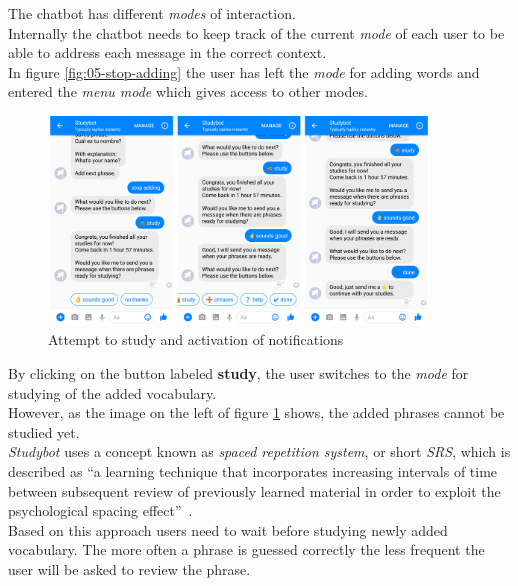The chatbot has different \emph{modes} of interaction.
\\
Internally the chatbot needs to keep track of the current \emph{mode} of each user to be able
to address each message in the correct context.
\\
In figure \ref{fig:05-stop-adding} the user has left the \emph{mode} for adding words
and entered the \emph{menu mode} which gives access to other modes.
\\

\begin{figure}[h]
  \centering
  \includegraphics[width=0.9\textwidth]{images/interface/06-enable-notify.png}
	\caption{Attempt to study and activation of notifications}
	\label{fig:06-enable-notify}
\end{figure}

By clicking on the button labeled \textbf{study},
the user switches to the \emph{mode} for studying of the added vocabulary.
\\
However, as the image on the left of figure \ref{fig:06-enable-notify} shows,
the added phrases cannot be studied yet.
\\

\emph{Studybot} uses a concept known as \emph{spaced repetition system}, or short \emph{SRS},
which is described as ``a learning technique that incorporates increasing intervals of time between subsequent review of previously learned material in order to exploit the psychological spacing effect''~\cite{srs}.
\\
Based on this approach users need to wait before studying newly added vocabulary.
The more often a phrase is guessed correctly the less frequent the user will be asked to review the phrase.
\\

